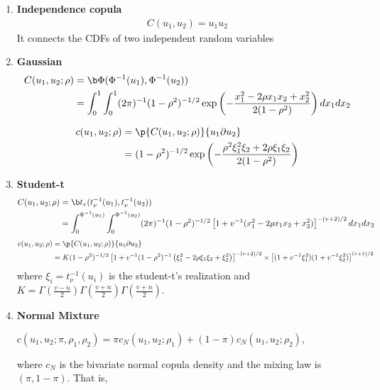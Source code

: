\begin{enumerate}


\item \textbf{Independence copula}
\begin{align*}
C(u_1,u_2) = u_1u_2
\end{align*}
It connects the CDFs of two independent random variables

\item \textbf{Gaussian}
\begin{align*}
C(u_1, u_2; \rho) 
&= \b \Phi(\Phi^{-1}(u_1), \Phi^{-1}(u_2))
\\
&= \int_0^1 \int_0^1 (2\pi)^{-1}(1 - \rho^2)^{-1/2} \exp\left(-\frac{x_1^2 - 2\rho x_1 x_2 + x_2^2}{2(1 - \rho^2)}\right) dx_1 dx_2
\end{align*}

\begin{align*}
c(u_1, u_2; \rho) 
&= \p{C(u_1,u_2;\rho)}{u_1 \partial u_2}
\\
&= (1 - \rho^2)^{-1/2} \exp\left(-\frac{\rho^2 \xi_1^2 \xi_2 + 2\rho \xi_1 \xi_2}{2(1 - \rho^2)}\right)
\end{align*}

\item \textbf{Student-t}
\begin{align*}
C(u_1, u_2; \rho) &= \b t_v(t_{\nu}^{-1}(u_1), t_{\nu}^{-1}(u_2))
\\
&= \int_0^{\Phi^{-1}(u_1)} \int_0^{\Phi^{-1}(u_2)} (2\pi)^{-1} (1 - \rho^2)^{-1/2} \left[1 + v^{-1}(x_1^2 - 2\rho x_1 x_2 + x_2^2)\right]^{-(v+2)/2} dx_1 dx_2
\end{align*}
\begin{align*}
c(u_1, u_2; \rho) 
&= \p{C(u_1,u_2;\rho)}{u_1 \partial u_2}
\\
&= K(1 - \rho^2)^{-1/2} \left[1 + v^{-1}(1 - \rho^2)^{-1} \left(\xi_1^2 -2\rho\xi_1 \xi_2+ \xi_2^2\right)\right]^{-(v+2)/2} \times
\left[(1 + v^{-1} \xi_1^2)(1 + v^{-1} \xi_2^2)\right]^{(v+1)/2}
\end{align*}
where 
$\xi_i=t_{\nu}^{-1}(u_i)$ is the student-t's realization
and
$
K = \Gamma\left(\frac{v - n}{2}\right) \Gamma\left(\frac{v + n}{2}\right) \Gamma\left(\frac{v + n}{2}\right).
$


\item \textbf{Normal Mixture}

$
c(u_1, u_2; \pi, \rho_1, \rho_2) = \pi c_N(u_1, u_2; \rho_1) + (1 - \pi) c_N(u_1, u_2; \rho_2) ,
$

where $ c_N $ is the bivariate normal copula density and the mixing law is $ (\pi, 1 - \pi) $. That is,


\end{enumerate}
